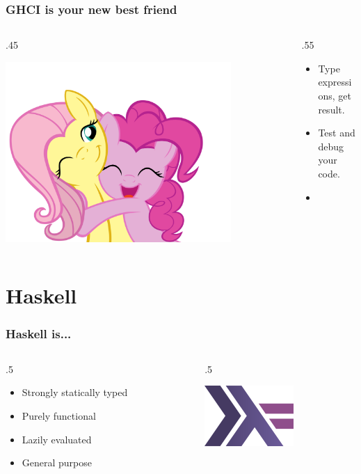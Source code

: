 \documentclass[17pt]{beamer}
\renewcommand{\(}[1]{\begin{columns}[#1]}
\renewcommand{\)}{\end{columns}}
\newcommand{\<}[1]{\begin{column}{#1}}
\renewcommand{\>}{\end{column}}
\begin{document}
\begin{frame}
  \frametitle{GHCI is your new best friend}
  \({c}
  \<{.45\textwidth}
  \begin{center}
    \includegraphics[width=0.8\textwidth]{img/hug}
  \end{center}
  \>
  \<{.55\textwidth}
  \begin{center}
  \begin{itemize}
    \item Type expressions, get result.
    \item Test and debug your code.
    \item {}
  \end{itemize}
  \end{center}
  \>
  \)
\end{frame}




\section{Haskell}

\begin{frame}
  \frametitle{Haskell is...}
  \({c}
  \<{.5\textwidth}
  \begin{center}
    \begin{itemize}
    \item Strongly statically typed
    \item Purely functional
    \item Lazily evaluated
    \item General purpose
    \end{itemize}
  \end{center}
  \>
  \<{.5\textwidth}
  \begin{center}
    \includegraphics[width=.5\textwidth]{img/haskell}
  \end{center}
  \>
  \)
\end{frame}
\end{document}
